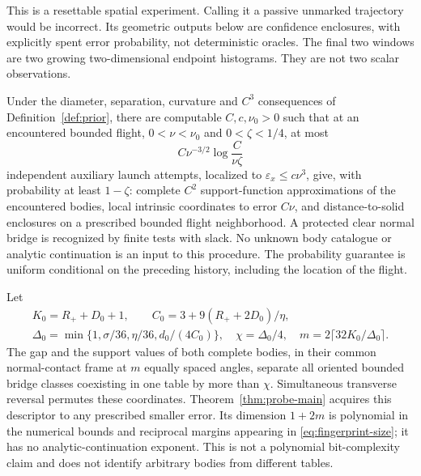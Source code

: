 This is a resettable spatial experiment. Calling it a passive unmarked
trajectory would be incorrect. Its geometric outputs below are confidence
enclosures, with explicitly spent error probability, not deterministic
oracles. The final two windows are two growing two-dimensional endpoint
histograms. They are not two scalar observations.

\begin{theorem}\label{thm:probe-main}
Under the diameter, separation, curvature and $C^3$ consequences of
Definition~\ref{def:prior}, there are computable $C,c,\nu_0>0$ such that
at an encountered bounded flight, $0<\nu<\nu_0$ and $0<\zeta<1/4$,
at most
\begin{equation}\label{eq:probe-main}
 C\nu^{-3/2}\log\frac{C}{\nu\zeta}
\end{equation}
independent auxiliary launch attempts, localized to
$\varepsilon_x\le c\nu^3$, give, with probability at least $1-\zeta$:
complete $C^2$ support-function approximations of the encountered bodies,
local intrinsic coordinates to error $C\nu$, and distance-to-solid
enclosures on a prescribed bounded flight neighborhood. A protected clear
normal bridge is recognized by finite tests with slack. No unknown body
catalogue or analytic continuation is an input to this procedure.
The probability guarantee is uniform conditional on the preceding
history, including the location of the flight.
\end{theorem}

\begin{theorem}\label{thm:fingerprint-main}
Let
\begin{gather}
 K_0=R_++D_0+1,\qquad C_0=3+9(R_++2D_0)/\eta,\nonumber\\
 \Delta_0=\min\{1,\sigma/36,\eta/36,d_0/(4C_0)\},\quad
 \chi=\Delta_0/4,\quad m=2\lceil32K_0/\Delta_0\rceil.\label{eq:fingerprint-size}
\end{gather}
The gap and the support values of both complete bodies, in their common
normal-contact frame at $m$ equally spaced angles, separate all oriented
bounded bridge classes coexisting in one table by more than $\chi$.
Simultaneous transverse reversal permutes these coordinates.
Theorem~\ref{thm:probe-main} acquires this descriptor to any prescribed
smaller error. Its dimension $1+2m$ is polynomial in the numerical bounds
and reciprocal margins appearing in \eqref{eq:fingerprint-size}; it has
no analytic-continuation exponent. This is not a polynomial bit-complexity
claim and does not identify arbitrary bodies from different tables.
\end{theorem}


